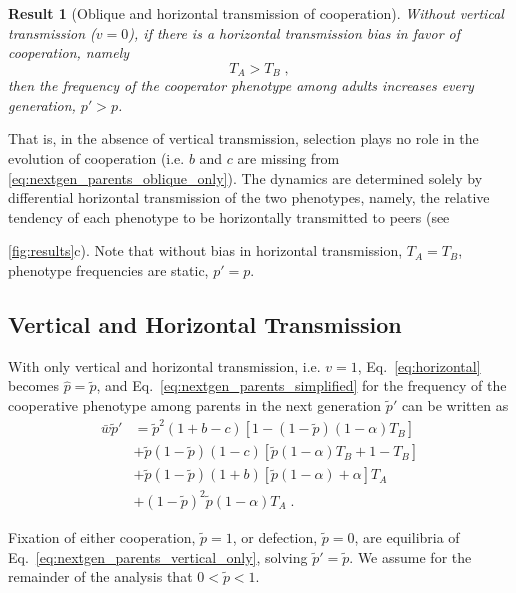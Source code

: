 \documentclass[12pt]{extarticle}
\newtheorem{result}{Result}
\begin{document}
\begin{result}[Oblique and horizontal transmission of cooperation] \label{result:obli_hori}
Without vertical transmission ($v=0$), if there is a horizontal transmission bias in favor of cooperation, namely
\begin{equation} \label{eq:oblique_only_result}
T_A > T_B \;,
\end{equation}
then the frequency of the cooperator phenotype among adults increases every generation, $p'>p$.
\end{result}

That is, in the absence of vertical transmission, selection plays no role in the evolution of cooperation (i.e. $b$ and $c$ are missing from \autoref{eq:nextgen_parents_oblique_only}).
The dynamics are determined solely by differential horizontal transmission of the two phenotypes, namely, the relative tendency of each phenotype to be horizontally transmitted to peers (see~{\autoref{fig:results}c).
Note that without bias in horizontal transmission, $T_A = T_B$, phenotype frequencies are static, $p'=p$.


\subsection*{Vertical and Horizontal Transmission}

With only vertical and horizontal transmission, i.e. $v=1$, Eq.\ \ref{eq:horizontal} becomes
$\hat{p} =  \tilde{p}$,
and Eq.\ \ref{eq:nextgen_parents_simplified} for the frequency of the cooperative phenotype among parents in the next generation $\tilde{p}'$ can be written as
\begin{equation} \label{eq:nextgen_parents_vertical_only} 
\begin{aligned}
\bar{w} \tilde{p}' 
& = \tilde{p}^2 (1+b-c) [1 - (1-\tilde{p}) (1-\alpha) T_B] \\
& + \tilde{p}(1-\tilde{p}) (1-c) [\tilde{p} (1-\alpha) T_B + 1 - T_B] \\
& + \tilde{p}(1-\tilde{p}) (1+b) [\tilde{p} (1-\alpha) + \alpha] T_A \\
& + (1-\tilde{p})^2 \tilde{p} (1-\alpha) T_A \;.
\end{aligned}
\end{equation}

Fixation of either cooperation, $\tilde{p}=1$, or defection, 
$\tilde{p}=0$, are equilibria of Eq.\ \ref{eq:nextgen_parents_vertical_only}, solving $\tilde{p}'= \tilde{p}$.
We assume for the remainder of the analysis that $0<\tilde{p}<1$.

}
\end{document}
